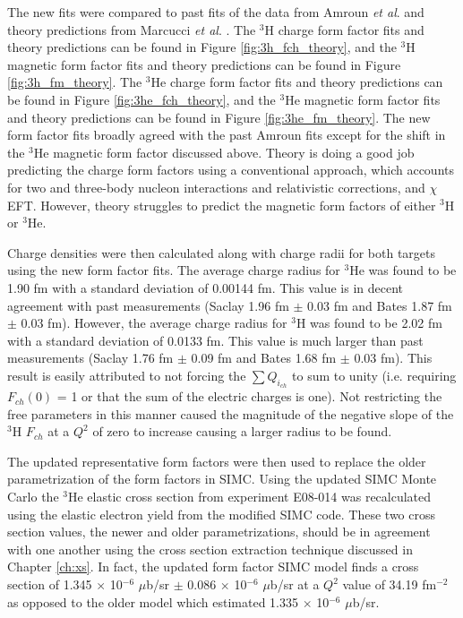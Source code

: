 The new fits were compared to past fits of the data from Amroun \textit{et al}. \cite{Article:Amroun} and theory predictions from Marcucci \textit{et al}. \cite{Article:Marcucci}. The $^3$H charge form factor fits and theory predictions can be found in Figure \ref{fig:3h_fch_theory}, and the $^3$H magnetic form factor fits and theory predictions can be found in Figure \ref{fig:3h_fm_theory}. The $^3$He charge form factor fits and theory predictions can be found in Figure \ref{fig:3he_fch_theory}, and the $^3$He magnetic form factor fits and theory predictions can be found in Figure \ref{fig:3he_fm_theory}. The new form factor fits broadly agreed with the past Amroun fits except for the shift in the $^3$He magnetic form factor discussed above. Theory is doing a good job predicting the charge form factors using a conventional approach, which accounts for two and three-body nucleon interactions and relativistic corrections, and $\chi$EFT. However, theory struggles to predict the magnetic form factors of either $^3$H or $^3$He. 

Charge densities were then calculated along with charge radii for both targets using the new form factor fits. The average charge radius for $^3$He was found to be 1.90 fm with a standard deviation of 0.00144 fm. This value is in decent agreement with past measurements (Saclay 1.96 fm $\pm$ 0.03 fm and Bates 1.87 fm $\pm$ 0.03 fm). However, the average charge radius for $^3$H was found to be 2.02 fm with a standard deviation of 0.0133 fm. This value is much larger than past measurements (Saclay 1.76 fm $\pm$ 0.09 fm and Bates 1.68 fm $\pm$ 0.03 fm). This result is easily attributed to not forcing the $\sum Q_{i_{ch}}$ to sum to unity (i.e. requiring $F_{ch}(0)$ = 1 or that the sum of the electric charges is one). Not restricting the free parameters in this manner caused the magnitude of the negative slope of the $^3$H $F_{ch}$ at a $Q^2$ of zero to increase causing a larger radius to be found.

The updated representative form factors were then used to replace the older parametrization of the form factors in SIMC. Using the updated SIMC Monte Carlo the $^3$He elastic cross section from experiment E08-014 was recalculated using the elastic electron yield from the modified SIMC code. These two cross section values, the newer and older parametrizations, should be in agreement with one another using the cross section extraction technique discussed in Chapter \ref{ch:xs}. In fact, the updated form factor SIMC model finds a cross section of 1.345 $\times$ 10$^{-6}$ $\mu$b/sr $\pm$ 0.086 $\times$ 10$^{-6}$ $\mu$b/sr at a $Q^2$ value of 34.19 fm$^{-2}$ as opposed to the older model which estimated 1.335 $\times$ 10$^{-6}$ $\mu$b/sr.

